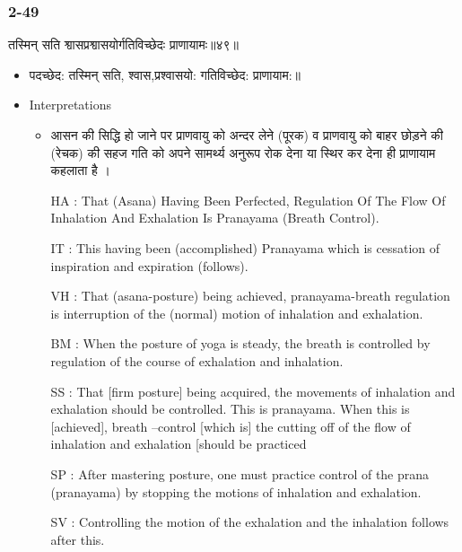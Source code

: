 \begin{frame}[fragile]\frametitle{2-49}
\begin{sanskrit}
तस्मिन् सति श्वासप्रश्वासयोर्गतिविच्छेदः प्राणायामः॥४९॥
\end{sanskrit}

	\begin{itemize}
	\item पदच्छेद: तस्मिन् सति, श्वास,प्रश्वासयो: गतिविच्छेद: प्राणायाम:॥
	\item Interpretations
		\begin{itemize}
		\item आसन की सिद्धि हो जाने पर प्राणवायु को अन्दर लेने (पूरक) व प्राणवायु को बाहर छोड़ने की (रेचक) की सहज गति को अपने सामर्थ्य अनुरूप रोक देना या स्थिर कर देना ही प्राणायाम कहलाता है ।
		\item [HA]: That (Asana) Having Been Perfected, Regulation Of The Flow Of Inhalation And Exhalation Is Pranayama (Breath Control).
		\item [IT]: This having been (accomplished) Pranayama which is cessation of inspiration and expiration (follows).
		\item [VH]: That (asana-posture) being achieved, pranayama-breath regulation is interruption of the (normal) motion of inhalation and exhalation.
		\item [BM]: When the posture of yoga is steady, the breath is controlled by regulation of the course of exhalation and inhalation.
		\item [SS]: That [firm posture] being acquired, the movements of inhalation and exhalation should be controlled. This is pranayama. When this is [achieved], breath –control [which is] the cutting off of the flow of inhalation and exhalation [should be practiced
		\item [SP]: After mastering posture, one must practice control of the prana (pranayama) by stopping the motions of inhalation and exhalation.
		\item [SV]: Controlling the motion of the exhalation and the inhalation follows after this. 
		\end{itemize}
	\end{itemize}	
\end{frame}



